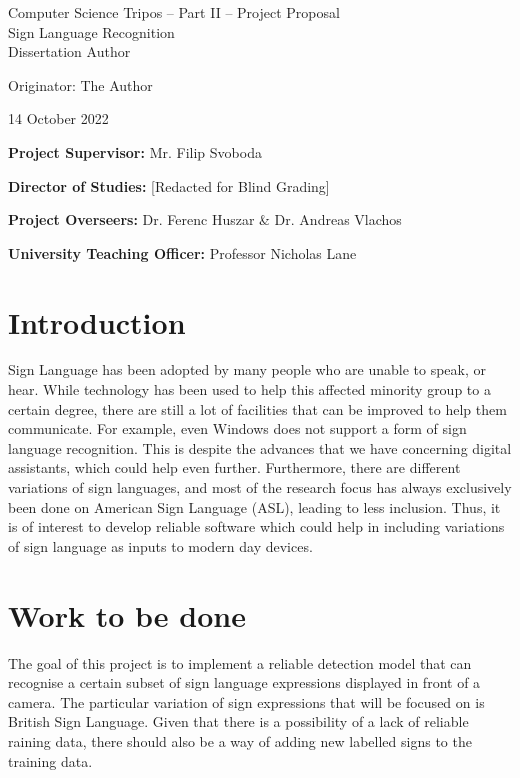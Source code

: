 \documentclass[12pt,a4paper,twoside]{article}
\begin{document}
%

\begin{center}
    \Large
    Computer Science Tripos -- Part II -- Project Proposal\\[4mm]
    \LARGE
    Sign Language Recognition\\[4mm]

    \large
    Dissertation Author

    Originator: The Author

    14 October 2022
\end{center}

\vspace{5mm}

\textbf{Project Supervisor:} Mr. Filip Svoboda

\textbf{Director of Studies:} [Redacted for Blind Grading]

\textbf{Project Overseers:} Dr. Ferenc Huszar \& Dr. Andreas Vlachos

\textbf{University Teaching Officer:} Professor Nicholas Lane


\section*{Introduction}

Sign Language has been adopted by many people who are unable to speak, or hear. While technology has been used to help this affected minority group to a certain degree, there are still a lot of facilities that can be improved to help them communicate. For example, even Windows does not support a form of sign language recognition. This is  despite the advances that we have concerning digital assistants, which could help even further. Furthermore, there are different variations of sign languages, and most of the research focus has always exclusively been done on American Sign Language (ASL), leading to less inclusion. Thus, it is of interest to develop reliable software which could help in including variations of sign language as inputs to modern day devices.


\section*{Work to be done}

The goal of this project is to implement a reliable detection model that can recognise a certain subset of sign language expressions displayed in front of a camera. The particular variation of sign expressions that will be focused on is British Sign Language. Given that there is a possibility of a lack of reliable raining data, there should also be a way of adding new labelled signs to the training data.
\end{document}
